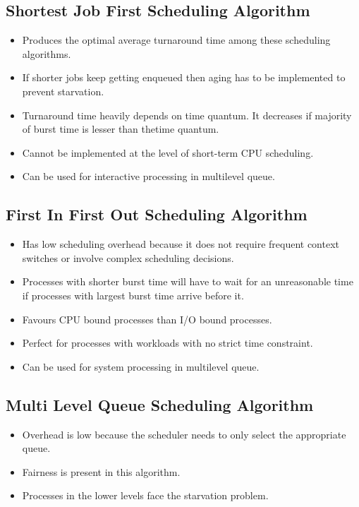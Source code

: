 \documentclass{article}
\begin{document}
\subsection{Shortest Job First Scheduling Algorithm}
\begin{itemize}
  \item Produces the optimal average turnaround time among these scheduling algorithms.
  \item If shorter jobs keep getting enqueued then aging has to be implemented to prevent starvation.
  \item Turnaround time heavily depends on time quantum. It decreases if majority of burst time is lesser than thetime quantum.
  \item Cannot be implemented at the level of short-term CPU scheduling.
  \item Can be used for interactive processing in multilevel queue.
\end{itemize}

\subsection{First In First Out Scheduling Algorithm}
\begin{itemize}
  \item Has low scheduling overhead because it does not require frequent context switches or involve complex scheduling decisions.
  \item Processes with shorter burst time will have to wait for an unreasonable time if processes with largest burst time arrive before it.
  \item Favours CPU bound processes than I/O bound processes.
  \item Perfect for processes with workloads with no strict time constraint.
  \item Can be used for system processing in multilevel queue.
\end{itemize}

\subsection{Multi Level Queue Scheduling Algorithm}
\begin{itemize}
  \item Overhead is low because the scheduler needs to only select the appropriate queue.
  \item Fairness is present in this algorithm.
  \item Processes in the lower levels face the starvation problem.
\end{itemize}
\end{document}
